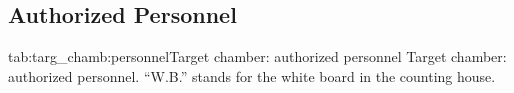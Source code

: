 {\begin{safetyen}{10}{15}
\section[Authorized  Personnel]{Authorized  Personnel}
\end{safetyen}

\begin{namestab}{tab:targ_chamb:personnel}{Target chamber: authorized personnel}{%
      Target chamber: authorized personnel. ``W.B.'' stands for the white board 
      in the counting house.}
  \EdFolts{}
  \JianPingChen{}
\end{namestab}
}
